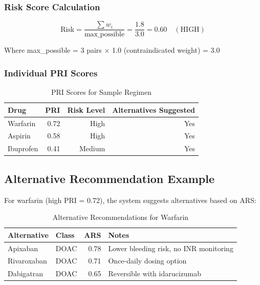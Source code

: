 \documentclass[11pt,a4paper]{article}
\begin{document}
\subsubsection{Risk Score Calculation}

\begin{equation}
\text{Risk} = \frac{\sum w_i}{\text{max\_possible}} = \frac{1.8}{3.0} = 0.60 \quad (\text{HIGH})
\end{equation}

Where max\_possible = 3 pairs × 1.0 (contraindicated weight) = 3.0

\subsubsection{Individual PRI Scores}

\begin{table}[H]
\centering
\caption{PRI Scores for Sample Regimen}
\label{tab:pri_example}
\begin{tabular}{lrrr}
\toprule
\textbf{Drug} & \textbf{PRI} & \textbf{Risk Level} & \textbf{Alternatives Suggested} \\
\midrule
Warfarin & 0.72 & High & Yes \\
Aspirin & 0.58 & High & Yes \\
Ibuprofen & 0.41 & Medium & Yes \\
\bottomrule
\end{tabular}
\end{table}

\subsection{Alternative Recommendation Example}

For warfarin (high PRI = 0.72), the system suggests alternatives based on ARS:

\begin{table}[H]
\centering
\caption{Alternative Recommendations for Warfarin}
\label{tab:alt_example}
\begin{tabular}{llrp{5cm}}
\toprule
\textbf{Alternative} & \textbf{Class} & \textbf{ARS} & \textbf{Notes} \\
\midrule
Apixaban & DOAC & 0.78 & Lower bleeding risk, no INR monitoring \\
Rivaroxaban & DOAC & 0.71 & Once-daily dosing option \\
Dabigatran & DOAC & 0.65 & Reversible with idarucizumab \\
\bottomrule
\end{tabular}
\end{table}
\end{document}
